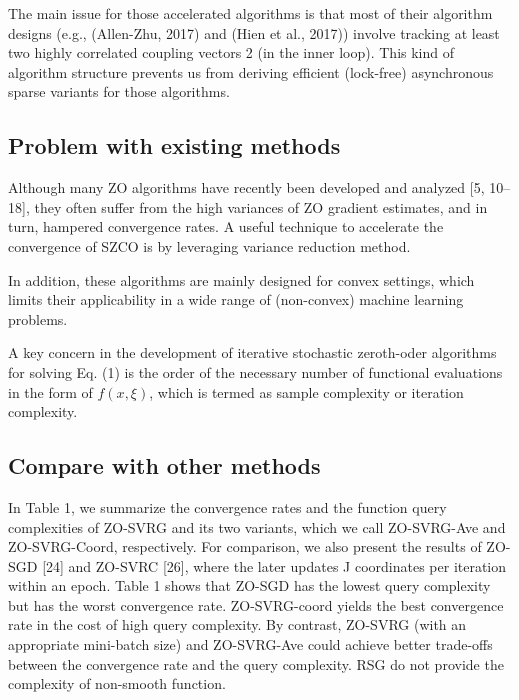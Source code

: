 \documentclass{article}
\theoremstyle{definition}
\theoremstyle{remark}
\begin{document}
{\color{DarkOrchid}
The main issue for those accelerated algorithms is that most of their algorithm designs (e.g., (Allen-Zhu, 2017)
and (Hien et al., 2017)) involve tracking at least two highly
correlated coupling vectors 2 (in the inner loop). This kind
of algorithm structure prevents us from deriving efficient
(lock-free) asynchronous sparse variants for those algorithms.
}
\subsection{Problem with existing methods}
{\color{Brown}
Although many ZO algorithms have recently been developed and analyzed [5, 10–18], they often
suffer from the high variances of ZO gradient estimates, and in turn, hampered convergence rates.
{\color{RubineRed}
A useful technique to accelerate the convergence of SZCO is by leveraging variance reduction method.
}

 In addition, these algorithms are mainly designed for convex settings, which limits their applicability in a wide range of (non-convex) machine learning problems.
}

{\color{RubineRed}
A key concern in the development of iterative stochastic zeroth-oder algorithms for solving Eq. (1) is the order of the necessary number of functional evaluations in the form of
$f(x,\xi)$, which is termed as sample complexity or iteration complexity.
}


\subsection{Compare with other methods}
{\color{Brown}
In Table 1, we summarize the convergence rates
and the function query complexities of ZO-SVRG and its two variants, which we call ZO-SVRG-Ave
and ZO-SVRG-Coord, respectively. For comparison, we also present the results of ZO-SGD [24] and
ZO-SVRC [26], where the later updates J coordinates per iteration within an epoch. Table 1 shows
that ZO-SGD has the lowest query complexity but has the worst convergence rate. ZO-SVRG-coord
yields the best convergence rate in the cost of high query complexity. By contrast, ZO-SVRG (with
an appropriate mini-batch size) and ZO-SVRG-Ave could achieve better trade-offs between the
convergence rate and the query complexity.
}
{\color{Brown}
RSG \cite{} do not provide the complexity of non-smooth function.
}
\end{document}
